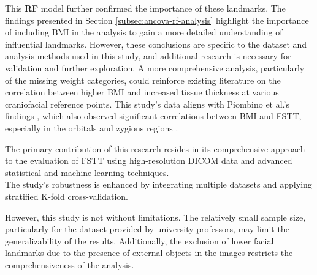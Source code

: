 \documentclass[journal,article,submit,pdftex,moreauthors]{Definitions/mdpi}
\begin{document}
This \textbf{RF} model further confirmed the importance of these landmarks. 
The findings presented in Section \ref{subsec:ancova-rf-analysis} highlight the importance of including BMI in the analysis to gain a more detailed understanding of influential landmarks. However, these conclusions are specific to the dataset and analysis methods used in this study, and additional research is necessary for validation and further exploration. A more comprehensive analysis, particularly of the missing weight categories, could reinforce existing literature on the correlation between higher BMI and increased tissue thickness at various craniofacial reference points. This study's data aligns with Piombino et al.'s findings \cite{ref19}, which also observed significant correlations between BMI and FSTT, especially in the orbitals and zygions regions \cite{ref1,ref2}.



The primary contribution of this research resides in its comprehensive approach to the evaluation of FSTT using high-resolution DICOM data and advanced statistical and machine learning techniques. \\The study’s robustness is enhanced by integrating multiple datasets and applying stratified K-fold cross-validation.

However, this study is not without limitations. The relatively small sample size, particularly for the dataset provided by university professors, may limit the generalizability of the results. Additionally, the exclusion of lower facial landmarks due to the presence of external objects in the images restricts the comprehensiveness of the analysis.
\end{document}
